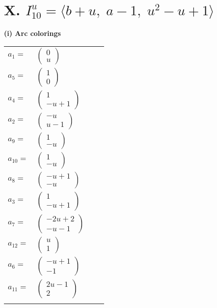 \documentclass[1p]{elsarticle_modified}
\theoremstyle{definition}
\begin{document}
\centering \section*{X. $I^u_{10}= \langle b+u,\;a-1,\;u^2- u+1 \rangle$}
\flushleft \textbf{(i) Arc colorings}\\
\begin{tabular}{m{7pt} m{180pt} m{7pt} m{180pt} }
\flushright $a_{1}=$&$\begin{pmatrix}0\\u\end{pmatrix}$ \\
\flushright $a_{5}=$&$\begin{pmatrix}1\\0\end{pmatrix}$ \\
\flushright $a_{4}=$&$\begin{pmatrix}1\\- u+1\end{pmatrix}$ \\
\flushright $a_{2}=$&$\begin{pmatrix}- u\\u-1\end{pmatrix}$ \\
\flushright $a_{9}=$&$\begin{pmatrix}1\\- u\end{pmatrix}$ \\
\flushright $a_{10}=$&$\begin{pmatrix}1\\- u\end{pmatrix}$ \\
\flushright $a_{8}=$&$\begin{pmatrix}- u+1\\- u\end{pmatrix}$ \\
\flushright $a_{3}=$&$\begin{pmatrix}1\\- u+1\end{pmatrix}$ \\
\flushright $a_{7}=$&$\begin{pmatrix}-2 u+2\\- u-1\end{pmatrix}$ \\
\flushright $a_{12}=$&$\begin{pmatrix}u\\1\end{pmatrix}$ \\
\flushright $a_{6}=$&$\begin{pmatrix}- u+1\\-1\end{pmatrix}$ \\
\flushright $a_{11}=$&$\begin{pmatrix}2 u-1\\2\end{pmatrix}$\\&\end{tabular}
\end{document}

